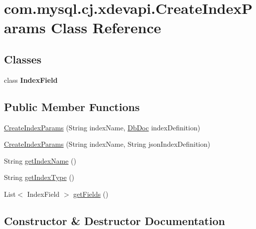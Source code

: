 \hypertarget{classcom_1_1mysql_1_1cj_1_1xdevapi_1_1_create_index_params}{}\section{com.\+mysql.\+cj.\+xdevapi.\+Create\+Index\+Params Class Reference}
\label{classcom_1_1mysql_1_1cj_1_1xdevapi_1_1_create_index_params}
\subsection*{Classes}
\begin{DoxyCompactItemize}
\item 
class {\bfseries Index\+Field}
\end{DoxyCompactItemize}
\subsection*{Public Member Functions}
\begin{DoxyCompactItemize}
\item 
\mbox{\hyperlink{classcom_1_1mysql_1_1cj_1_1xdevapi_1_1_create_index_params_a4b60834b272fa92eedcfd657357ef3b2}{Create\+Index\+Params}} (String index\+Name, \mbox{\hyperlink{interfacecom_1_1mysql_1_1cj_1_1xdevapi_1_1_db_doc}{Db\+Doc}} index\+Definition)
\item 
\mbox{\hyperlink{classcom_1_1mysql_1_1cj_1_1xdevapi_1_1_create_index_params_ace495890fd81e353187523415afabb0a}{Create\+Index\+Params}} (String index\+Name, String json\+Index\+Definition)
\item 
String \mbox{\hyperlink{classcom_1_1mysql_1_1cj_1_1xdevapi_1_1_create_index_params_a4f866cc4a1ca10a230ea290e065122f3}{get\+Index\+Name}} ()
\item 
String \mbox{\hyperlink{classcom_1_1mysql_1_1cj_1_1xdevapi_1_1_create_index_params_a75dc333dcf689c02cdeb2255decde50e}{get\+Index\+Type}} ()
\item 
List$<$ Index\+Field $>$ \mbox{\hyperlink{classcom_1_1mysql_1_1cj_1_1xdevapi_1_1_create_index_params_a1b419ee66153e3e41cefc9492e97f393}{get\+Fields}} ()
\end{DoxyCompactItemize}


\subsection{Constructor \& Destructor Documentation}
\mbox{\label{classcom_1_1mysql_1_1cj_1_1xdevapi_1_1_create_index_params_a4b60834b272fa92eedcfd657357ef3b2}} 
